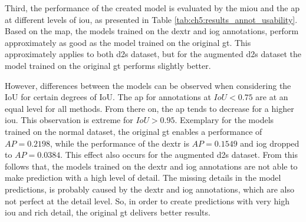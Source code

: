 Third, the performance of the created model is evaluated by the \gls{miou} and the \gls{ap} at different levels of \gls{iou}, as presented in Table \ref{tab:ch5:results_annot_usability}.
Based on the \gls{map}, the models trained on the \gls{dextr} and \gls{iog} annotations, perform approximately as good as the model trained on the original \gls{gt}.
This approximately applies to both \gls{d2s} dataset, but for the augmented \gls{d2s} dataset the model trained on the original \gls{gt} performs slightly better.

However, differences between the models can be observed when considering the IoU for certain degrees of IoU.
The \gls{ap} for annotations at $ IoU < 0.75 $ are at an equal level for all methods.
From there on, the \gls{ap} tends to decrease for a higher \gls{iou}.
This observation is extreme for $ IoU > 0.95 $. 
Exemplary for the models trained on the normal dataset, the original \gls{gt} enables a performance of $ AP = 0.2198 $, while the performance of the \gls{dextr} is $ AP = 0.1549 $ and \gls{iog} dropped to $ AP = 0.0384 $.
This effect also occurs for the augmented \gls{d2s} dataset.
From this follows that, the models trained on the \gls{dextr} and \gls{iog} annotations are not able to make prediction with a high level of detail.
The missing details in the model predictions, is probably caused by the \gls{dextr} and \gls{iog} annotations, which are also not perfect at the detail level.
So, in order to create predictions with very high \gls{iou} and rich detail, the original \gls{gt} delivers better results.


